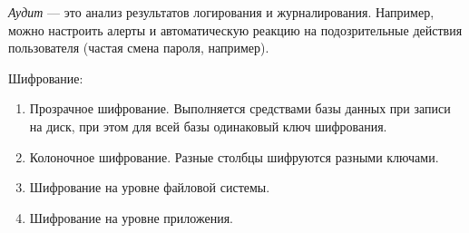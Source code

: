 \begin{remark}
  \textit{Аудит} --- это анализ результатов логирования и журналирования.
  Например, можно настроить алерты и автоматическую реакцию на подозрительные
  действия пользователя (частая смена пароля, например).
\end{remark}

Шифрование:
\begin{enumerate}
\item
  Прозрачное шифрование. Выполняется средствами базы данных при записи на диск,
  при этом для всей базы одинаковый ключ шифрования.

\item
  Колоночное шифрование. Разные столбцы шифруются разными ключами.

\item
  Шифрование на уровне файловой системы.

\item
  Шифрование на уровне приложения.
\end{enumerate}
